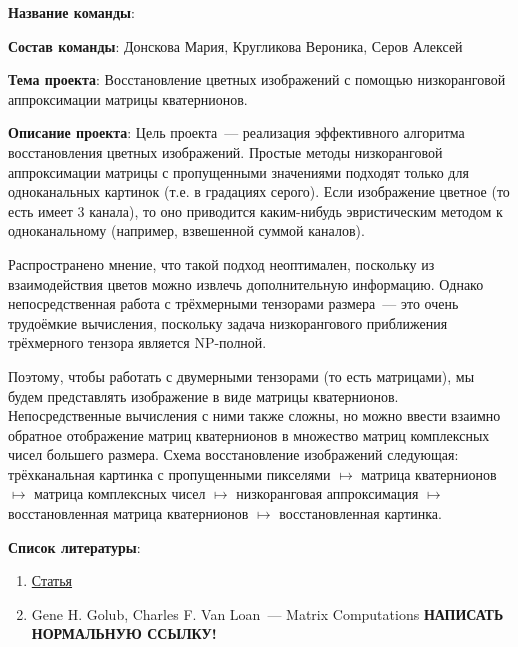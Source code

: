 \documentclass[12pt]{article}
\begin{document}
\textbf{Название команды}:


\textbf{Состав команды}:
Донскова Мария, Кругликова Вероника, Серов Алексей


\textbf{Тема проекта}:
Восстановление цветных изображений с помощью низкоранговой аппроксимации матрицы кватернионов.


\textbf{Описание проекта}:
Цель проекта~--- реализация эффективного алгоритма восстановления цветных изображений.
Простые методы низкоранговой аппроксимации матрицы с пропущенными значениями подходят только для одноканальных картинок (т.е. в градациях серого).
Если изображение цветное (то есть имеет 3 канала), то оно приводится каким-нибудь эвристическим методом к одноканальному (например, взвешенной суммой каналов).

Распространено мнение, что такой подход неоптимален, поскольку из взаимодействия цветов можно извлечь дополнительную информацию.
Однако непосредственная работа с трёхмерными тензорами размера~--- это очень трудоёмкие вычисления, поскольку задача низкорангового приближения трёхмерного тензора является NP-полной.

Поэтому, чтобы работать с двумерными тензорами (то есть матрицами), мы будем представлять изображение в виде матрицы кватернионов.
Непосредственные вычисления с ними также сложны, но можно ввести взаимно обратное отображение матриц кватернионов в множество матриц комплексных чисел большего размера.
Схема восстановление изображений следующая: трёхканальная картинка с пропущенными пикселями $\mapsto$ матрица кватернионов $\mapsto$ матрица комплексных чисел $\mapsto$ низкоранговая аппроксимация $\mapsto$ восстановленная матрица кватернионов $\mapsto$ восстановленная картинка.  


\textbf{Список литературы}:
    \begin{enumerate}[label=\arabic*)]
	\item
	    \href{https://arxiv.org/abs/1909.06567}{Статья}

	\item
	    Gene H. Golub, Charles F. Van Loan~--- Matrix Computations \textbf{НАПИСАТЬ НОРМАЛЬНУЮ ССЫЛКУ!}
    \end{enumerate}
\end{document}
